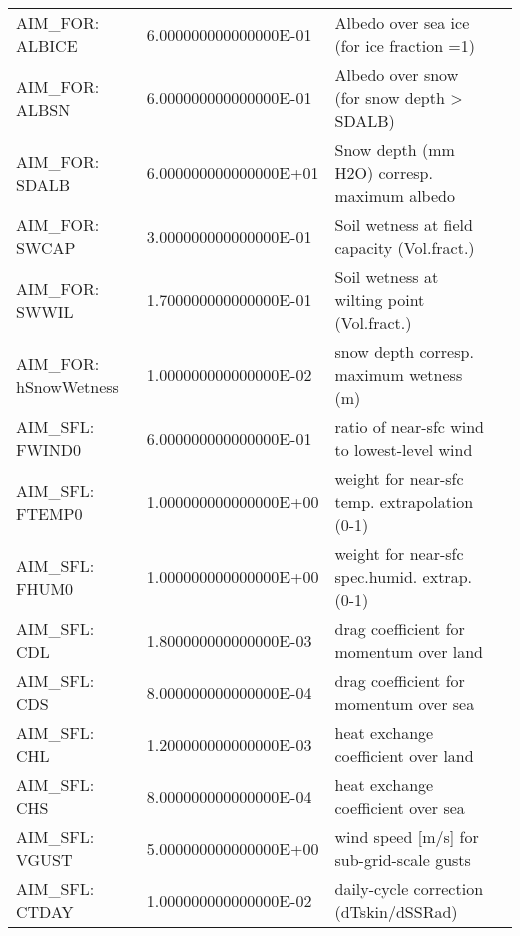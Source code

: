 \begin{table}
\begin{tabular}{lllc}
   AIM\_FOR: ALBICE   &                   6.000000000000000E-01
    &   Albedo over sea ice (for ice fraction =1) 
    &  %
    \\
   AIM\_FOR:  ALBSN   &                   6.000000000000000E-01
    &   Albedo over snow (for snow depth > SDALB) 
    &  %
    \\
   AIM\_FOR:  SDALB   &                   6.000000000000000E+01
    &   Snow depth (mm H2O) corresp. maximum albedo 
    &  %
    \\
   AIM\_FOR:  SWCAP   &                   3.000000000000000E-01
    &   Soil wetness at field capacity (Vol.fract.) 
    &  %
    \\
   AIM\_FOR:  SWWIL   &                   1.700000000000000E-01
    &   Soil wetness at wilting point  (Vol.fract.) 
    &  %
    \\
   AIM\_FOR: hSnowWetness  &                   1.000000000000000E-02
    &   snow depth corresp. maximum wetness (m) 
    &  %
    \\
   AIM\_SFL: FWIND0   &                   6.000000000000000E-01
    &   ratio of near-sfc wind to lowest-level wind 
    &  %
    \\
   AIM\_SFL: FTEMP0   &                   1.000000000000000E+00
    &   weight for near-sfc temp. extrapolation (0-1)
    &  %
    \\
   AIM\_SFL:  FHUM0   &                   1.000000000000000E+00
    &   weight for near-sfc spec.humid. extrap. (0-1)
    &  %
    \\
   AIM\_SFL:    CDL   &                   1.800000000000000E-03
    &   drag coefficient for momentum over land 
    &  %
    \\
   AIM\_SFL:    CDS   &                   8.000000000000000E-04
    &   drag coefficient for momentum over sea  
    &  %
    \\
   AIM\_SFL:    CHL   &                   1.200000000000000E-03
    &   heat exchange coefficient over land 
    &  %
    \\
   AIM\_SFL:    CHS   &                   8.000000000000000E-04
    &   heat exchange coefficient over sea  
    &  %
    \\
   AIM\_SFL:  VGUST   &                   5.000000000000000E+00
    &   wind speed [m/s] for sub-grid-scale gusts 
    &  %
    \\
   AIM\_SFL:  CTDAY   &                   1.000000000000000E-02
    &   daily-cycle correction (dTskin/dSSRad) 

\end{tabular}
\end{table}
